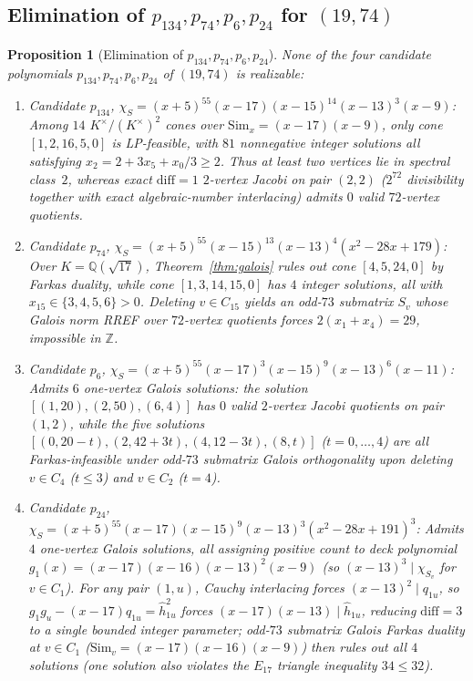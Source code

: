 \documentclass[11pt,reqno]{amsart}
\newtheorem{proposition}[theorem]{Proposition}
\theoremstyle{definition}
\theoremstyle{remark}
\numberwithin{equation}{section}
\numberwithin{table}{section}
\begin{document}
\subsection{Elimination of \texorpdfstring{$p_{134}, p_{74}, p_6, p_{24}$}{p\_134, p\_74, p\_6, p\_24} for \texorpdfstring{$(19, 74)$}{(19, 74)}}
\begin{proposition}[Elimination of $p_{134}, p_{74}, p_6, p_{24}$]\label{prop:other_19_74}
None of the four candidate polynomials $p_{134}, p_{74}, p_6, p_{24}$ of $(19, 74)$ is realizable:
\begin{enumerate}
  \item \emph{Candidate $p_{134}$, $\chi_S = (x+5)^{55}(x-17)(x-15)^{14}(x-13)^3(x-9)$:} Among $14$ $K^\times/(K^\times)^2$ cones over $\mathrm{Sim}_x = (x-17)(x-9)$, only cone $[1, 2, 16, 5, 0]$ is LP-feasible, with $81$ nonnegative integer solutions all satisfying $x_2 = 2 + 3x_5 + x_0/3 \ge 2$. Thus at least two vertices lie in spectral class~$2$, whereas exact $\mathrm{diff}=1$ $2$-vertex Jacobi on pair $(2, 2)$ ($2^{72}$ divisibility together with exact algebraic-number interlacing) admits $0$ valid $72$-vertex quotients.
  \item \emph{Candidate $p_{74}$, $\chi_S = (x+5)^{55}(x-15)^{13}(x-13)^4(x^2-28x+179)$:} Over $K = \mathbb{Q}(\sqrt{17})$, Theorem~\ref{thm:galois} rules out cone $[4, 5, 24, 0]$ by Farkas duality, while cone $[1, 3, 14, 15, 0]$ has $4$ integer solutions, all with $x_{15} \in \{3, 4, 5, 6\} > 0$. Deleting $v \in C_{15}$ yields an odd-$73$ submatrix $S_v$ whose Galois norm RREF over $72$-vertex quotients forces $2(x_1 + x_4) = 29$, impossible in $\mathbb{Z}$.
  \item \emph{Candidate $p_6$, $\chi_S = (x+5)^{55}(x-17)^3(x-15)^9(x-13)^6(x-11)$:} Admits $6$ one-vertex Galois solutions: the solution $[(1, 20), (2, 50), (6, 4)]$ has $0$ valid $2$-vertex Jacobi quotients on pair $(1, 2)$, while the five solutions $[(0, 20-t), (2, 42+3t), (4, 12-3t), (8, t)]$ ($t = 0, \dots, 4$) are all Farkas-infeasible under odd-$73$ submatrix Galois orthogonality upon deleting $v \in C_4$ ($t \le 3$) and $v \in C_2$ ($t = 4$).
  \item \emph{Candidate $p_{24}$, $\chi_S = (x+5)^{55}(x-17)(x-15)^9(x-13)^3(x^2-28x+191)^3$:} Admits $4$ one-vertex Galois solutions, all assigning positive count to deck polynomial $g_1(x) = (x-17)(x-16)(x-13)^2(x-9)$ (so $(x-13)^3 \mid \chi_{S_v}$ for $v \in C_1$). For any pair $(1, u)$, Cauchy interlacing forces $(x-13)^2 \mid q_{1u}$, so $g_1 g_u - (x-17)q_{1u} = \hat{h}_{1u}^2$ forces $(x-17)(x-13) \mid \hat{h}_{1u}$, reducing $\mathrm{diff} = 3$ to a single bounded integer parameter; odd-$73$ submatrix Galois Farkas duality at $v \in C_1$ ($\mathrm{Sim}_v = (x-17)(x-16)(x-9)$) then rules out all $4$ solutions (one solution also violates the $E_{17}$ triangle inequality $34 \le 32$).
\end{enumerate}
\end{proposition}
\end{document}

